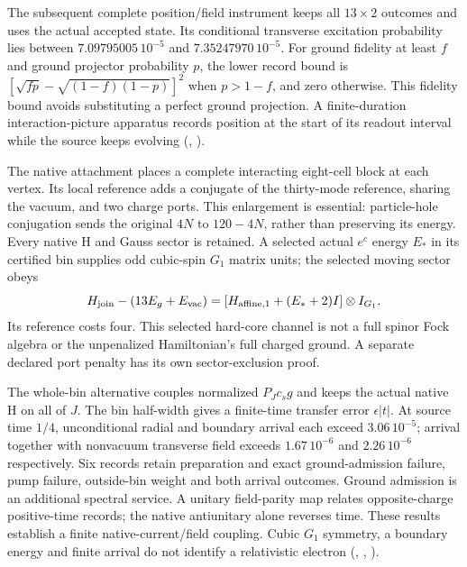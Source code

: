 The subsequent complete position/field instrument keeps all $13\times2$
outcomes and uses the actual accepted state. Its conditional transverse
excitation probability lies between $7.09795005\,10^{-5}$ and
$7.35247970\,10^{-5}$. For ground fidelity at least $f$ and ground
projector probability $p$, the lower record bound is
$[\sqrt{fp}-\sqrt{(1-f)(1-p)}]^2$ when $p>1-f$, and zero otherwise.
This fidelity bound avoids substituting a perfect ground projection.
A finite-duration interaction-picture apparatus records position at the
start of its readout interval while the source keeps evolving
(, \cite{ophrepo}).

The native attachment places a complete interacting eight-cell block at
each vertex. Its local reference adds a conjugate of the thirty-mode
reference, sharing the vacuum, and two charge ports. This enlargement
is essential: particle-hole conjugation sends the original $4N$ to
$120-4N$, rather than preserving its energy. Every native H and Gauss
sector is retained. A selected actual $e^c$ energy $E_*$ in its certified
bin supplies odd cubic-spin $G_1$ matrix units; the selected moving sector
obeys
\[
 H_{\rm join}-(13E_g+E_{\rm vac})
  =[H_{{\rm affine},1}+(E_*+2)I]\otimes I_{G_1}.
\]
Its reference costs four. This selected hard-core channel is not a full
spinor Fock algebra or the unpenalized Hamiltonian's full charged ground.
A separate declared port penalty has its own sector-exclusion proof.

The whole-bin alternative couples normalized $P_Jc_sg$ and keeps the
actual native H on all of $J$. The bin half-width gives a finite-time
transfer error $\epsilon|t|$. At source time $1/4$, unconditional radial
and boundary arrival each exceed $3.06\,10^{-5}$; arrival together with
nonvacuum transverse field exceeds $1.67\,10^{-6}$ and
$2.26\,10^{-6}$ respectively. Six records retain preparation and exact
ground-admission failure, pump failure, outside-bin weight and both
arrival outcomes. Ground admission is an additional spectral service.
A unitary field-parity map relates opposite-charge positive-time records;
the native antiunitary alone reverses time. These results establish a
finite native-current/field coupling. Cubic $G_1$ symmetry, a boundary
energy and finite arrival do not identify a relativistic electron
(,
,
\cite{ophrepo}).

